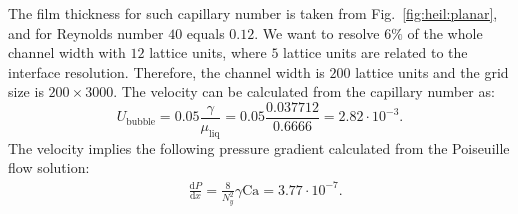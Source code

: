 \documentclass[preprint,12pt]{elsarticle}
\newcommand{\Ca}{\mathrm{Ca}}
\begin{document}
\begin{description}
  The film thickness for such capillary number is taken from Fig.~\ref{fig:heil:planar},
  and for Reynolds number $40$ equals $0.12$. We want to
  resolve $6\%$ of the whole channel width with $12$ lattice units, where $5$
lattice units are related to the interface resolution.  Therefore, the channel
  width is $200$ lattice units and the grid size is $200 \times 3000$. The velocity can be
calculated from the capillary number as:
  \begin{equation}
  U_{\mathrm{bubble}}=0.05 \frac{\gamma}{\mu_{\mathrm{liq}}}=0.05 \frac{0.037712}{0.6666}=2.82\cdot
  10^{-3}.
  \end{equation}
  The velocity implies the following pressure gradient calculated from the
  Poiseuille flow solution:
  \begin{equation}
  \begin{aligned}
  &\frac{\mathrm{d}P}{\mathrm{d}x}=\frac{8}{N_y^2}\gamma \Ca=3.77\cdot10^{-7}.
  \end{aligned}
  \end{equation}

\end{description}
\end{document}
